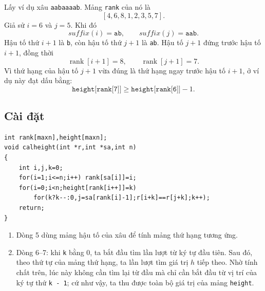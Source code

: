 \documentclass[11pt]{article}
\begin{document}
Lấy ví dụ xâu \texttt{aabaaaab}. Mảng \texttt{rank} của nó là
\[
  [4,6,8,1,2,3,5,7].
\]
Giả sử $i=6$ và $j=5$. Khi đó
\[
  suffix(i)=\texttt{ab},\qquad suffix(j)=\texttt{aab}.
\]
Hậu tố thứ $i+1$ là \texttt{b}, còn hậu tố thứ $j+1$ là \texttt{ab}. Hậu tố
$j+1$ đứng trước hậu tố $i+1$, đồng thời
\[
  \operatorname{rank}[i+1]=8,\qquad \operatorname{rank}[j+1]=7.
\]
Vì thứ hạng của hậu tố $j+1$ vừa đúng là thứ hạng ngay trước hậu tố $i+1$, ở
ví dụ này đạt dấu bằng:
\[
  \texttt{height[rank[7]]}\ge \texttt{height[rank[6]]}-1.
\]

\subsection*{Cài đặt}

\begingroup
\small
\begin{verbatim}
int rank[maxn],height[maxn];
void calheight(int *r,int *sa,int n)
{
    int i,j,k=0;
    for(i=1;i<=n;i++) rank[sa[i]]=i;
    for(i=0;i<n;height[rank[i++]]=k)
        for(k?k--:0,j=sa[rank[i]-1];r[i+k]==r[j+k];k++);
    return;
}
\end{verbatim}
\endgroup

\begin{enumerate}
  \item Dòng 5 dùng mảng hậu tố của xâu để tính mảng thứ hạng tương ứng.

  \item Dòng 6--7: khi \texttt{k} bằng $0$, ta bắt đầu tìm lần lượt từ ký tự
  đầu tiên. Sau đó, theo thứ tự của mảng thứ hạng, ta lần lượt tìm giá trị
  $h$ tiếp theo. Nhờ tính chất trên, lúc này không cần tìm lại từ đầu mà chỉ
  cần bắt đầu từ vị trí của ký tự thứ \texttt{k - 1}; cứ như vậy, ta thu được
  toàn bộ giá trị của mảng \texttt{height}.
\end{enumerate}
\end{document}
